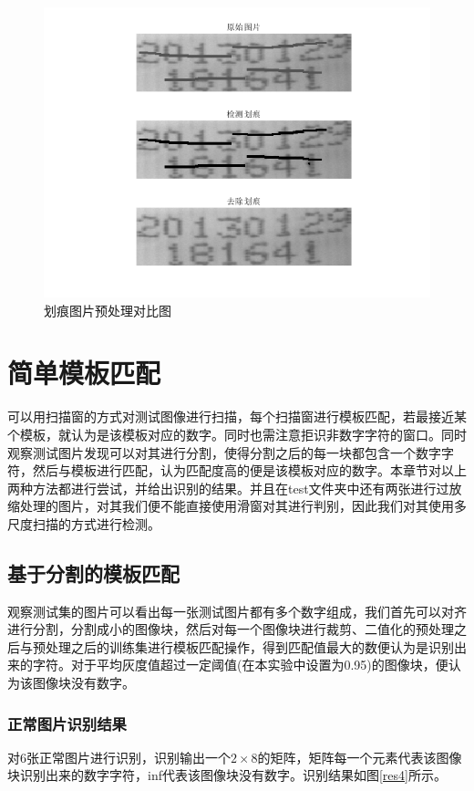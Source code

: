 \documentclass[cn]{elegantbook}
\begin{document}
\begin{figure}[!h]
	\centering
	\includegraphics[width=\textwidth]{res3}
	\caption{\label{res3}划痕图片预处理对比图}
\end{figure}

\chapter{简单模板匹配}
可以用扫描窗的方式对测试图像进行扫描，每个扫描窗进行模板匹配，若最接近某个模板，就认为是该模板对应的数字。同时也需注意拒识非数字字符的窗口。同时观察测试图片发现可以对其进行分割，使得分割之后的每一块都包含一个数字字符，然后与模板进行匹配，认为匹配度高的便是该模板对应的数字。本章节对以上两种方法都进行尝试，并给出识别的结果。并且在test文件夹中还有两张进行过放缩处理的图片，对其我们便不能直接使用滑窗对其进行判别，因此我们对其使用多尺度扫描的方式进行检测。

\section{基于分割的模板匹配}
\label{sec1}
观察测试集的图片可以看出每一张测试图片都有多个数字组成，我们首先可以对齐进行分割，分割成小的图像块，然后对每一个图像块进行裁剪、二值化的预处理之后与预处理之后的训练集进行模板匹配操作，得到匹配值最大的数便认为是识别出来的字符。对于平均灰度值超过一定阈值(在本实验中设置为0.95)的图像块，便认为该图像块没有数字。

\subsection{正常图片识别结果}
对6张正常图片进行识别，识别输出一个$2\times 8$的矩阵，矩阵每一个元素代表该图像块识别出来的数字字符，inf代表该图像块没有数字。识别结果如图\ref{res4}所示。
\end{document}
